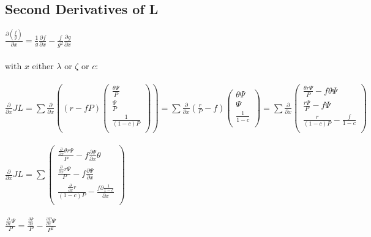\documentclass{article}
\begin{document}
\subsection{Second Derivatives of L}

$\frac{\partial (\frac{f}{g})}{\partial x}=\frac{1}{g}\frac{\partial f}{\partial x}-\frac{f}{g^2}\frac{\partial g}{\partial x}$
\\\\
with $x$ either $\lambda$ or $\zeta$ or $c$:
\\\\
$\frac{\partial }{\partial x} JL = 
\sum \frac{\partial }{\partial x} ((r-f P) ( \begin{array}{c}
  \frac{\theta \Psi }{P} \\
  \frac{\Psi }{P} \\
  \frac{1}{(1-c) P} \\
\end{array} )) = 
\sum \frac{\partial }{\partial x} (\frac{r}{P}-f) ( \begin{array}{c}
  \theta \Psi \\
  \Psi \\
  \frac{1}{1-c} \\
\end{array} ) =
\sum \frac{\partial }{\partial x} ( \begin{array}{c}
  \frac{\theta r \Psi }{P}-f \theta \Psi \\
  \frac{r \Psi }{P}-f \Psi \\
  \frac{r}{(1-c) P}-\frac{f}{1-c} \\
\end{array} )$
\\\\
$\frac{\partial }{\partial x} JL = 
\sum( \begin{array}{c}
  \frac{\frac{\partial }{\partial x} \theta r \Psi }{P}-f \frac{\partial \Psi }{\partial x} \theta \\
  \frac{\frac{\partial }{\partial x} r \Psi }{P}-f \frac{\partial \Psi }{\partial x} \\
  \frac{\frac{\partial }{\partial x} r}{(1-c) P}-\frac{f \partial \frac{1}{1-c}}{\partial x} \\
\end{array} )$
\\\\
$\frac{\frac{\partial }{\partial x} \Psi }{P}=\frac{\frac{\partial \Psi }{\partial x}}{P}-\frac{\frac{\partial P}{\partial x} \Psi }{P^2}$
\\\\
\end{document}
